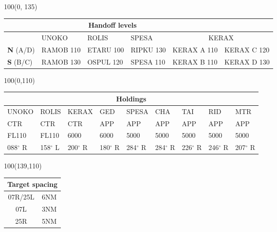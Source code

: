 \documentclass[10pt,landscape,a4paper]{article}
\begin{document}
\begin{textblock}{100}(0, 135)
\begin{table}[]
\begin{tabular}{|l|l|l|l||l|l|}
\multicolumn{5}{c}{\textbf{Handoff levels}}              \\ \hline
           & UNOKO     & ROLIS     & SPESA     & \multicolumn{2}{c|}{KERAX}     \\ \hline
\textbf{N} (A/D) & RAMOB 110 & ETARU 100 & RIPKU 130 & KERAX A 110 & KERAX C 120\\
\textbf{S} (B/C) & RAMOB 130 & OSPUL 120 & SPESA 110 & KERAX B 110 & KERAX D 130\\ \hline
\end{tabular}
\end{table}
\end{textblock}

\begin{textblock}{100}(0,110)
\begin{table}[]
\begin{tabular}{|l|l|l|l|l|l|l|l|l|}

\multicolumn{9}{c}{\textbf{Holdings}}                                        \\ \hline
UNOKO  & ROLIS  & KERAX  & GED    & SPESA  & CHA    & TAI    & RID    & MTR    \\ \hline
CTR    & CTR    & CTR    & APP    & APP    & APP    & APP    & APP    & APP    \\
FL110  & FL110  & 6000   & 6000   & 5000   & 5000   & 5000   & 5000   & 5000   \\
088$^\circ$ R & 158$^\circ$ L & 200$^\circ$ R & 180$^\circ$ R & 284$^\circ$ R & 284$^\circ$ R & 226$^\circ$ R & 246$^\circ$ R & 207$^\circ$ R \\ \hline
\end{tabular}
\end{table}
\end{textblock}

\begin{textblock}{100}(139,110)
\begin{table}[]
\begin{tabular}{|c|l|}
\multicolumn{2}{c}{\textbf{Target spacing}} \\ \hline
07R/25L  & 6NM  \\ \hline
07L      & 3NM  \\ \hline
25R      & 5NM  \\ \hline
\end{tabular}
\end{table}
\end{textblock}
\end{document}
